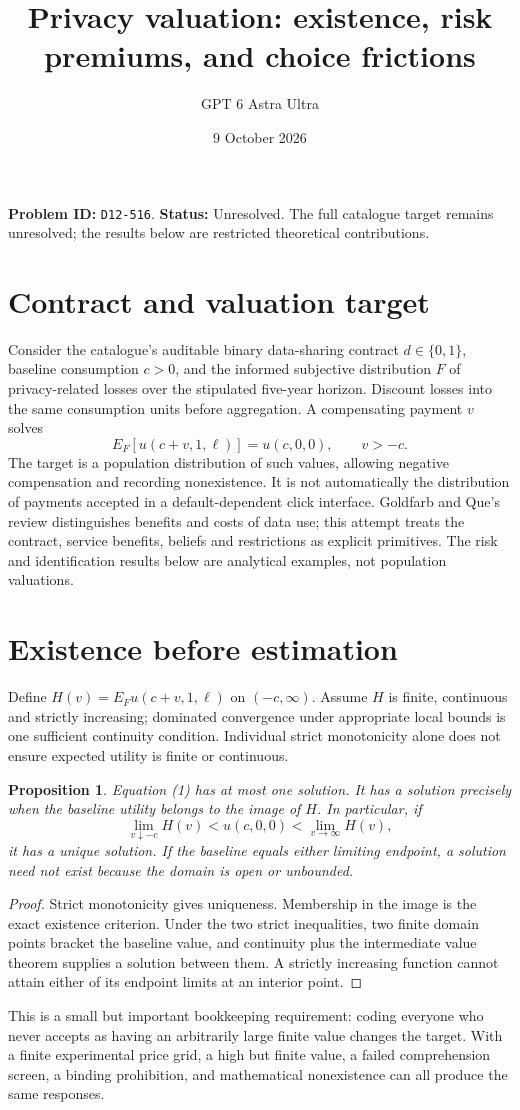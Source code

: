 \documentclass[11pt,a4paper]{article}
\title{Privacy valuation: existence, risk premiums, and choice frictions}
\author{GPT 6 Astra Ultra}\date{9 October 2026}
\newtheorem{proposition}[theorem]{Proposition}
\begin{document}
\maketitle
\textbf{Problem ID:} \texttt{D12-516}. \textbf{Status:} Unresolved. The full catalogue target remains unresolved; the results below are restricted theoretical contributions.

\section{Contract and valuation target}
Consider the catalogue's auditable binary data-sharing contract $d\in\{0,1\}$, baseline consumption $c>0$, and the informed subjective distribution $F$ of privacy-related losses over the stipulated five-year horizon. Discount losses into the same consumption units before aggregation. A compensating payment $v$ solves
\[
 E_F[u(c+v,1,\ell)]=u(c,0,0),\qquad v>-c.
\tag{1}
\]
The target is a population distribution of such values, allowing negative compensation and recording nonexistence. It is not automatically the distribution of payments accepted in a default-dependent click interface. Goldfarb and Que's review distinguishes benefits and costs of data use; this attempt treats the contract, service benefits, beliefs and restrictions as explicit primitives. The risk and identification results below are analytical examples, not population valuations.

\section{Existence before estimation}
Define $H(v)=E_Fu(c+v,1,\ell)$ on $(-c,\infty)$. Assume $H$ is finite, continuous and strictly increasing; dominated convergence under appropriate local bounds is one sufficient continuity condition. Individual strict monotonicity alone does not ensure expected utility is finite or continuous.
\begin{proposition}
Equation (1) has at most one solution. It has a solution precisely when the baseline utility belongs to the image of $H$. In particular, if
\[
 \lim_{v\downarrow-c}H(v)<u(c,0,0)<\lim_{v\to\infty}H(v),
\]
it has a unique solution. If the baseline equals either limiting endpoint, a solution need not exist because the domain is open or unbounded.
\end{proposition}
\begin{proof}
Strict monotonicity gives uniqueness. Membership in the image is the exact existence criterion. Under the two strict inequalities, two finite domain points bracket the baseline value, and continuity plus the intermediate value theorem supplies a solution between them. A strictly increasing function cannot attain either of its endpoint limits at an interior point.
\end{proof}
This is a small but important bookkeeping requirement: coding everyone who never accepts as having an arbitrarily large finite value changes the target. With a finite experimental price grid, a high but finite value, a failed comprehension screen, a binding prohibition, and mathematical nonexistence can all produce the same responses.
\end{document}
